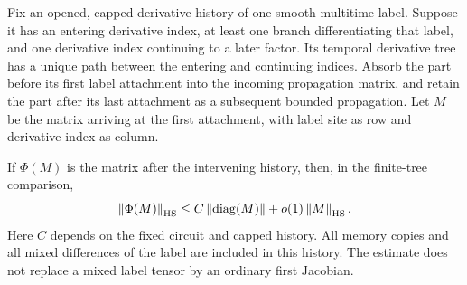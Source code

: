 \begin{lemma}\label{lem:hidden-marked-spine}
Fix an opened, capped derivative history of one smooth multitime
label. Suppose it has an entering derivative index, at least one
branch differentiating that label, and one derivative index continuing
to a later factor. Its temporal derivative tree has a unique path
between the entering and continuing indices. Absorb the part before
its first label attachment into the incoming propagation matrix, and
retain the part after its last attachment as a subsequent bounded
propagation. Let $M$ be the matrix arriving at the first attachment,
with label site as row and derivative index as column.

If $\Phi(M)$ is the matrix after the intervening history, then, in the
finite-tree comparison,
\begin{equation}\label{eq:hidden-marked-spine-bound}
 \left\lVert \Phi(M)\right\rVert_{\mathrm{HS}}
 \leq C\left\lVert \operatorname{diag}(M)\right\rVert+o(1)\left\lVert M\right\rVert_{\mathrm{HS}}.
\end{equation}
Here $C$ depends on the fixed circuit and capped history. All memory
copies and all mixed differences of the label are included in this
history. The estimate does not replace a mixed label tensor by an
ordinary first Jacobian.
\end{lemma}

